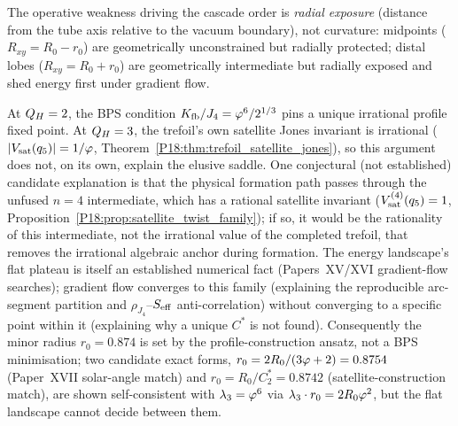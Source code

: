 \begin{remark}
\label{P18:rem:cascade_ordering}
The operative weakness driving the cascade order is \emph{radial
exposure} (distance from the tube axis relative to the vacuum
boundary), not curvature: midpoints ($R_{xy}=R_0-r_0$) are
geometrically unconstrained but radially protected; distal lobes
($R_{xy}=R_0+r_0$) are geometrically intermediate but radially
exposed and shed energy first under gradient flow.
\end{remark}

\begin{remark}
\label{P18:rem:saddle_difficulty}
At $Q_H=2$, the BPS condition $K_{\mathrm{fb}}/J_4=\varphi^6/2^{1/3}$ pins a unique
irrational profile fixed point. At $Q_H=3$, the trefoil's own
satellite Jones invariant is irrational
($|V_{\mathrm{sat}}(q_5)|=1/\varphi$,
Theorem~\ref{P18:thm:trefoil_satellite_jones}), so this argument does
not, on its own, explain the elusive saddle. One conjectural (not
established) candidate explanation is that the physical formation
path passes through the unfused $n=4$ intermediate, which has a
rational satellite invariant
($V_{\mathrm{sat}}^{(4)}(q_5)=1$,
Proposition~\ref{P18:prop:satellite_twist_family}); if so, it would
be the rationality of this intermediate, not the irrational value of
the completed trefoil, that removes the irrational algebraic anchor
during formation. The energy landscape's flat plateau is itself an
established numerical fact (Papers~XV/XVI gradient-flow searches);
gradient flow converges to this family (explaining the reproducible
arc-segment partition and $\rho_{J_4}$--$S_{\rm eff}$
anti-correlation) without converging to a specific point within it
(explaining why a unique $C^*$ is not found). Consequently the minor
radius $r_0=0.874$ is set by the profile-construction ansatz, not a
BPS minimisation; two candidate exact forms,
$r_0=2R_0/(3\varphi+2)=0.8754$ (Paper~XVII solar-angle match) and
$r_0=R_0/C_2^*=0.8742$ (satellite-construction match), are shown
self-consistent with $\lambda_3=\varphi^6$ via
$\lambda_3\cdot r_0=2R_0\varphi^2$, but the flat landscape cannot decide
between them.
\end{remark}

